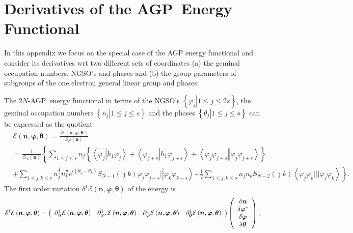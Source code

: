 \documentclass[aps,preprint]{revtex4}%
\begin{document}
\section{Derivatives of the AGP\ Energy Functional\label{variational}}

In this appendix we focus on the special case of the AGP energy functional and
consider its derivatives wrt two different sets of coordinates (a) the geminal
occupation numbers, NGSO's and phases and (b) the group parameters of
subgroups of the one electron general linear group and phases.

The $2N$-AGP\ energy functional in terms of the NGSO's $\left\{  \left.
\varphi_{j}\right\vert 1\leq j\leq2s\right\}  $, the geminal occupation
numbers $\left\{  \left.  n_{j}\right\vert 1\leq j\leq s\right\}  $ and the
phases $\left\{  \left.  \theta_{j}\right\vert 1\leq j\leq s\right\}  $ can be
expressed as the quotient%
\begin{align}
&  \mathcal{E}\left(  \bm{n},\bm{\varphi},\bm{\theta}\right)  =\frac
{\mathcal{H}\left(  \bm{n},\bm{\varphi},\bm{\theta}\right)  }{S_{N}\left(
\bm{n}\right)  }\nonumber\\
&  =\frac{1}{S_{N}\left(  \bm{n}\right)  }\left\{  \sum_{1\leq j\leq s}%
n_{j}\left\{  \left\langle \varphi_{j}\left\vert h_{1}\varphi_{j}\right.
\right\rangle +\left\langle \varphi_{j+s}\left\vert h_{1}\varphi_{j+s}\right.
\right\rangle +\left\langle \varphi_{j}\varphi_{j+s}\left\Vert \varphi
_{j}\varphi_{j+s}\right.  \right\rangle \right\}  \right. \nonumber\\
&  +\sum_{1\leq j,k\leq s}n_{j}^{\frac{1}{2}}n_{k}^{\frac{1}{2}}e^{i\left(
\theta_{j}-\theta_{k}\right)  }S_{N-1}\left(  \jmath k\right)  \varphi
_{j}\varphi_{j+s}|\left\vert \varphi_{k}\varphi_{k+s}\right\rangle \left.
+\frac{1}{2}\sum_{1\leq j,k\leq s}n_{j}n_{k}S_{N-2}\left(  \jmath k\right)
\left\langle \varphi_{j}\varphi_{k}|||\varphi_{j}\varphi_{k}\right\rangle
\right\}  .
\end{align}
The first order variation $\delta^{1}\mathcal{E}\left(
\bm{n},\bm{\varphi},\bm{\theta}\right)  $ of the energy is
\begin{equation}
\delta^{1}\mathcal{E}\left(  \bm{n},\bm{\varphi},\bm{\theta }\right)  =\left(
%
\begin{array}
[c]{cccc}%
\partial_{\bm{n}}^{1}\mathcal{E}\left(
\bm{n},\bm{\varphi },\bm{\theta}\right)  & \partial_{\bm{\varphi}^{\ast}}%
^{1}\mathcal{E}\left(  \bm{n},\bm{\varphi},\bm{\theta}\right)  &
\partial_{\bm{\varphi}}^{1}\mathcal{E}\left(
\bm{n},\bm{\varphi },\bm{\theta}\right)  & \partial_{\bm{\theta}}%
^{1}\mathcal{E}\left(  \bm{n},\bm{\varphi},\bm{\theta}\right)
\end{array}
\right)  \left(
\begin{array}
[c]{c}%
\delta\bm{n}\\
\delta\bm{\varphi}^{\ast}\\
\delta\bm{\varphi}\\
\delta\bm{\theta}
\end{array}
\right)  ,
\end{equation}
\end{document}

